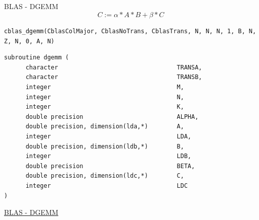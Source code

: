 \documentclass[xcolor=x11names,compress]{beamer}
\renewcommand{\(}{\begin{columns}}
\renewcommand{\)}{\end{columns}}
\newcommand{\<}[1]{\begin{column}{#1}}
\renewcommand{\>}{\end{column}}
\begin{document}
\subsection{}
\begin{frame}[fragile]{BLAS - DGEMM}
\[C := \alpha* A * B + \beta * C\]
\begin{tiny} \verb+cblas_dgemm(CblasColMajor, CblasNoTrans, CblasTrans, N, N, N, 1, B, N, Z, N, 0, A, N)+\end{tiny}
\begin{tiny}
\begin{verbatim}
subroutine dgemm (
	  character                                 TRANSA,
	  character                                 TRANSB,
	  integer                                   M,
	  integer                                   N,
	  integer                                   K,
	  double precision                          ALPHA,
	  double precision, dimension(lda,*)        A,
	  integer                                   LDA,
	  double precision, dimension(ldb,*)        B,
	  integer                                   LDB,
	  double precision                          BETA,
	  double precision, dimension(ldc,*)        C,
	  integer                                   LDC 
)
\end{verbatim}
\end{tiny} 
\href{https://software.intel.com/en-us/node/520775}{BLAS - DGEMM}
\end{frame}
\end{document}
